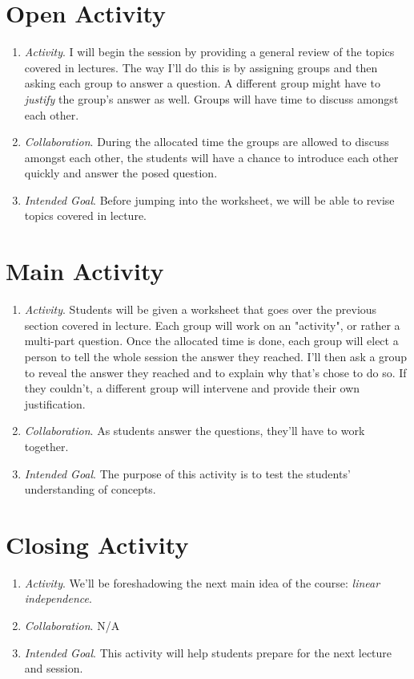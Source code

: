 \documentclass[11pt]{article}
\begin{document}
\newpage
{}
\section{\centering Open Activity}
	\begin{enumerate}
		\item \textit{Activity}. I will begin the session by providing a general review of the topics covered in lectures. The way I'll do this is by assigning groups and then
						asking each group to answer a question. A different group might have to \emph{justify} the group's answer as well. Groups will have
						time to discuss amongst each other.
		\item \textit{Collaboration}. During the allocated time the groups are allowed to discuss amongst each other, the students will have a chance to introduce each other
						quickly and answer the posed question.
		\item \textit{Intended Goal}. Before jumping into the worksheet, we will be able to revise topics covered in lecture.
	\end{enumerate}

\section{\centering Main Activity}
	\begin{enumerate}
		\item \textit{Activity}. Students will be given a worksheet that goes over the previous section covered in lecture. Each group will work on an "activity",
						or rather a multi-part question. Once the allocated time is done, each group will elect a person to tell the whole session the answer
						they reached. I'll then ask a group to reveal the answer they reached and to explain why that's chose to do so. If they couldn't, a different
						group will intervene and provide their own justification.
		\item \textit{Collaboration}. As students answer the questions, they'll have to work together. 
		\item \textit{Intended Goal}. The purpose of this activity is to test the students' understanding of concepts.
	\end{enumerate}

\section{\centering Closing Activity}
	\begin{enumerate}
		\item \textit{Activity}. We'll be foreshadowing the next main idea of the course: \textit{linear independence}.
		\item \textit{Collaboration}. \textsc{N/A}
		\item \textit{Intended Goal}. This activity will help students prepare for the next lecture and session.
	\end{enumerate}
\end{document}
